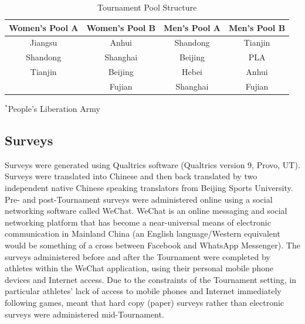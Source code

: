 \begin{table}[htpb]\caption{Tournament Pool Structure}
  \begin{center}
    \begin{small}
        \begin{tabular}{| c | c || c | c |}
          \hline
          \bf Women's Pool A & \bf Women's Pool B &  \bf Men's Pool A & \bf  Men's Pool B \\
          \hline
          Jiangsu & Anhui & Shandong & Tianjin \\
          Shandong & Shanghai & Beijing & PLA\superscript{*} \\
          Tianjin & Beijing & Hebei & Anhui \\
             & Fujian & Shanghai & Fujian \\
             \hline
        \end{tabular}
          \end{small}
        \end{center}

        \begin{footnotesize}
          $^*$People's Liberation Army
        \end{footnotesize}

  \label{tab:poolStructure}
    \end{table}



\subsection{Surveys}
Surveys were generated using Qualtrics software (Qualtrics version 9, Provo, UT). Surveys were translated into Chinese and then back translated by two independent native Chinese speaking translators from Beijing Sports University.  Pre- and post-Tournament surveys were administered online using a social networking software called WeChat. WeChat is an online messaging and social networking platform that has become a near-universal means of electronic communication in Mainland China (an English language/Western equivalent would be something of a cross between Facebook and WhatsApp Messenger). The surveys administered before and after the Tournament were completed by athletes within the WeChat application, using their personal mobile phone devices and Internet access. Due to the constraints of the Tournament setting, in particular athletes’ lack of access to mobile phones and Internet immediately following games, meant that hard copy (paper) surveys rather than electronic surveys were administered mid-Tournament.

